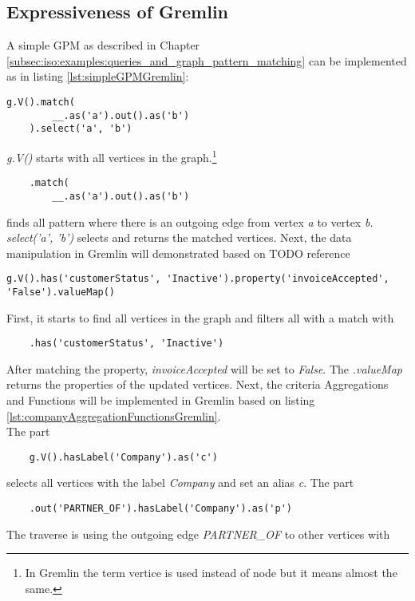 \subsection{Expressiveness of Gremlin}
\label{subsec:different_query_languages_for_graph_databases:gremlin:expressiveness}
A simple GPM as described in Chapter \ref{subsec:iso:examples:queries_and_graph_pattern_matching} can 
be implemented as in listing \ref{lst:simpleGPMGremlin}:
\begin{lstlisting}[caption={Graph Pattern Matching in Gremlin}, label={lst:simpleGPMGremlin}]
	g.V().match(
		__.as('a').out().as('b')
	).select('a', 'b')
\end{lstlisting}
\textit{g.V()} starts with all vertices in the graph.\footnote[1]{In Gremlin the term vertice is used
instead of node but it means almost the same.}
\begin{lstlisting}
	.match(
		__.as('a').out().as('b')
\end{lstlisting}
finds all pattern where there is an outgoing edge
from vertex \textit{a} to vertex \textit{b}.
\textit{select('a', 'b')} selects and returns the matched vertices.
Next, the data manipulation in Gremlin will demonstrated based on TODO reference 
\begin{lstlisting}[caption={Updating Vertex Properties in Gremlin}, label={lst:updateGremlin}]
	g.V().has('customerStatus', 'Inactive').property('invoiceAccepted', 'False').valueMap()
\end{lstlisting}
First, it starts to find all vertices in the graph and filters all with a match with
\begin{lstlisting}
	.has('customerStatus', 'Inactive')
\end{lstlisting}
After matching the property, \textit{invoiceAccepted} will be set to \textit{False}.
The \textit{.valueMap} returns the properties of the updated vertices.
Next, the criteria Aggregations and Functions will be implemented in Gremlin based 
on listing \ref{lst:companyAggregationFunctionsGremlin}.\\
The part 
\begin{lstlisting}
	g.V().hasLabel('Company').as('c')
\end{lstlisting}
selects all vertices with the label \textit{Company} and set an alias \textit{c}.
The part 
\begin{lstlisting}
	.out('PARTNER_OF').hasLabel('Company').as('p')
\end{lstlisting}
The traverse is using the outgoing edge \textit{PARTNER\_OF} to other vertices with 
